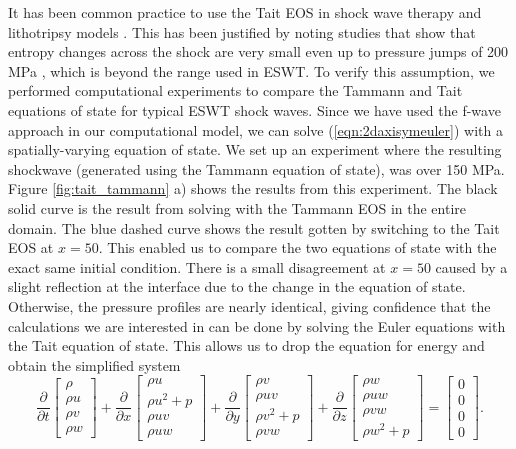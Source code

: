\documentclass{article}
\begin{document}
It has been common practice to use the Tait EOS in shock wave therapy and lithotripsy 
models \cite{saito,nakahara}.  
This has been justified by noting studies that show that entropy changes across the shock are very small 
even
up to pressure jumps of 200 MPa \cite{nakahara}, which is beyond the range used in ESWT.
To verify this assumption, we performed computational experiments to compare the Tammann and Tait 
equations of state for typical ESWT shock waves.  Since we have used the
f-wave approach in our computational model, we can solve
(\ref{eqn:2daxisymeuler}) with a spatially-varying equation of state.  We set up an experiment where the resulting shockwave (generated using the Tammann equation of state), was over 150 MPa.  Figure \ref{fig:tait_tammann} a) shows the results from this experiment.  The black solid curve is the result from solving with the Tammann EOS in the entire domain.  The blue dashed curve shows the result gotten by switching to the Tait EOS at $x=50$.  This enabled us to compare the two equations of state with the exact same initial condition.  There is a small disagreement at $x=50$ caused by a slight reflection at the interface due to the change in the equation of state.  Otherwise, the pressure profiles are nearly identical, giving
confidence that the calculations we are interested in can be done by solving the Euler equations with the 
Tait equation of state. This allows us to drop the equation for energy and obtain the simplified system
\begin{equation}
	\frac{\partial}{\partial t} \left[ \begin{array}{c} \rho \\ \rho u \\ \rho v \\ \rho w \end{array} \right] +
	\frac{\partial}{\partial x} \left[ \begin{array}{c} \rho u \\ \rho u^2 + p \\ \rho u v \\ \rho uw \end{array} \right] + 
	\frac{\partial}{\partial y} \left[ \begin{array}{c} \rho v \\ \rho u v\\ \rho v^2 + p \\ \rho vw \end{array} \right ] +
	\frac{\partial}{\partial z} \left[\begin{array}{c} \rho w \\ \rho uw \\ \rho vw \\ \rho w^2 + p \end{array} \right ] = 
	\left[ \begin{array}{c} 0 \\ 0 \\0 \\0 \end{array}\right ]. 
	\label{eqn:isentropic}
\end{equation}
\end{document}
